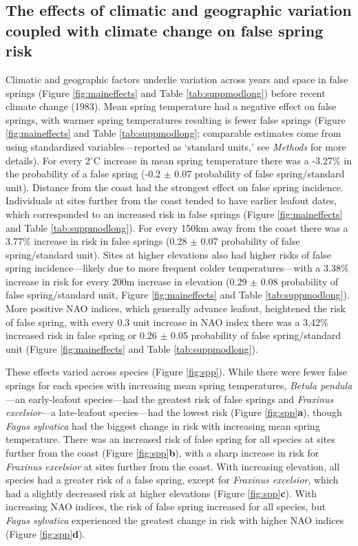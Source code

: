 \documentclass{article}\usepackage[]{graphicx}\usepackage[]{color}
\begin{document}
\subsection*{The effects of climatic and geographic variation coupled with climate change on false spring risk}
Climatic and geographic factors underlie variation across years and space in false springs (Figure \ref{fig:maineffects} and Table \ref{tab:suppmodlong}) before recent climate change (1983). Mean spring temperature had a negative effect on false springs, with warmer spring temperatures resulting is fewer false springs (Figure \ref{fig:maineffects} and Table \ref{tab:suppmodlong}; comparable estimates come from using standardized variables---reported as `standard units,' see \textit{Methods} for more details). For every 2$^{\circ}$C increase in mean spring temperature there was a -3.27\% in the probability of a false spring (-0.2 $\pm$ 0.07 probability of false spring/standard unit). Distance from the coast had the strongest effect on false spring incidence. Individuals at sites further from the coast tended to have earlier leafout dates, which corresponded to an increased risk in false springs (Figure \ref{fig:maineffects} and Table \ref{tab:suppmodlong}). For every 150km away from the coast there was a 3.77\% increase in risk in false springs (0.28 $\pm$ 0.07 probability of false spring/standard unit). Sites at higher elevations also had higher risks of false spring incidence---likely due to more frequent colder temperatures---with a 3.38\% increase in risk for every 200m increase in elevation (0.29 $\pm$ 0.08 probability of false spring/standard unit, Figure \ref{fig:maineffects} and Table \ref{tab:suppmodlong}). More positive NAO indices, which generally advance leafout, heightened the risk of false spring, with every 0.3 unit increase in NAO index there was a 3.42\% increased risk in false spring or 0.26 $\pm$ 0.05 probability of false spring/standard unit (Figure \ref{fig:maineffects} and Table \ref{tab:suppmodlong}).  

These effects varied across species (Figure \ref{fig:spp}). While there were fewer false springs for each species with increasing mean spring temperatures,  \textit{Betula pendula}---an early-leafout species---had the greatest risk of false springs and \textit{Fraxinus excelsior}---a late-leafout species---had the lowest risk (Figure \ref{fig:spp}\textbf{a}), though \textit{Fagus sylvatica} had the biggest change in risk with increasing mean spring temperature. There was an increased risk of false spring for all species at sites further from the coast (Figure \ref{fig:spp}\textbf{b}), with a sharp increase in risk for \textit{Fraxinus excelsior} at sites further from the coast. With increasing elevation, all species had a greater risk of a false spring, except for \textit{Fraxinus excelsior}, which had a slightly decreased risk at higher elevations (Figure \ref{fig:spp}\textbf{c}).  With increasing NAO indices, the risk of false spring increased for all species, but \textit{Fagus sylvatica} experienced the greatest change in risk with higher NAO indices (Figure \ref{fig:spp}\textbf{d}). 
\end{document}
